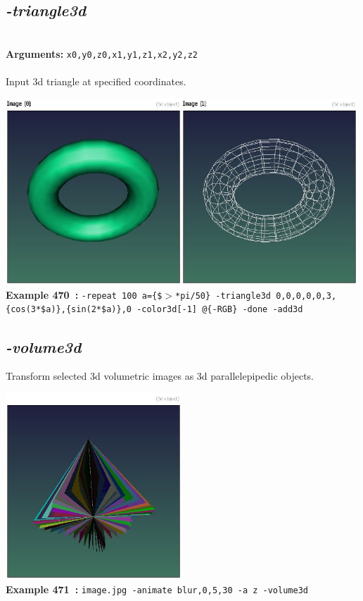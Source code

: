 \documentclass[a4paper,11pt,twoside]{book}
\begin{document}
\subsection{\emph{-triangle3d} }\vspace*{-0.5em}
~\\\textbf{Arguments: } 
{\small \texttt{x0,y0,z0,x1,y1,z1,x2,y2,z2}}\\~\\
Input 3d triangle at specified coordinates.
\begin{center}\includegraphics[keepaspectratio=true,height=7cm,width=\textwidth]{img/gmic_def470.jpg}\\
{\footnotesize \textbf{Example 470~:} \texttt{-repeat 100 a=\{\$$>$*pi/50\} -triangle3d 0,0,0,0,0,3,\{cos(3*\$a)\},\{sin(2*\$a)\},0 -color3d[-1] @\{-RGB\} -done -add3d}}
\end{center}

\subsection{\emph{-volume3d} }\vspace*{-0.5em}
Transform selected 3d volumetric images as 3d parallelepipedic objects.
\begin{center}\includegraphics[keepaspectratio=true,height=7cm,width=\textwidth]{img/gmic_def471.jpg}\\
{\footnotesize \textbf{Example 471~:} \texttt{image.jpg -animate blur,0,5,30 -a z -volume3d}}
\end{center}
\end{document}

